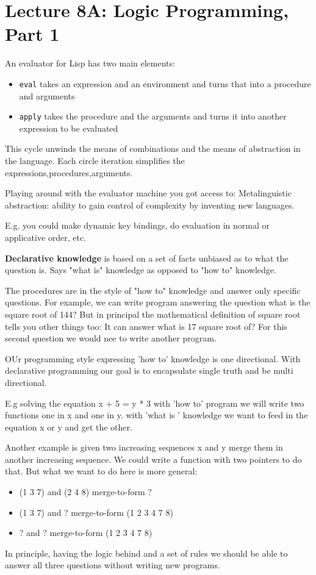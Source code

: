\documentclass[a4paper,twoside]{article}
\numberwithin{equation}{section}
\begin{document}
\section{Lecture 8A: Logic Programming, Part 1}
An evaluator for Lisp has two main elements:
\begin{itemize}
    \item \texttt{eval} takes an expression and an environment and turns that into a procedure and arguments
    \item \texttt{apply} takes the procedure and the arguments and turns it into another expression to be evaluated
\end{itemize}
This cycle unwinds the means of combinations and the means of abstraction in the language.
Each circle iteration simplifies the expressions,procedures,arguments.


Playing around with  the evaluator machine you got access to:
Metalinguistic abstraction: ability to gain control of complexity by inventing new languages.

E.g. you could make dynamic key bindings, do evaluation in normal or applicative order, etc.

\textbf{Declarative knowledge} is based on a set of facts unbiased as to what the question is.
Says "what is" knowledge as opposed to "how to" knowledge.

The procedures are in the style of "how to" knowledge and answer only specific questions.
For example, we can write program answering the question what is the square root of 144?
But in principal the mathematical definition of square root tells you other things too: It can answer
what is 17 square root of? For this second question we would nee to write another program.

OUr programming style expressing 'how to' knowledge is one directional. With declarative programming
our goal is to encapsulate single truth and be multi directional.

E.g solving the equation x + 5 = y * 3
with 'how to' program we will write two functions one in x and one in y.
with 'what is ' knowledge we want to feed in the equation x or y and get the other.

Another example is given two increasing sequences x and y merge them in another increasing sequence.
We could write a function with two pointers to do that. But what we want to do here is more general:
\begin{itemize}
    \item (1 3 7) and (2 4 8) merge-to-form ?
    \item (1 3 7) and ? merge-to-form (1 2 3 4 7 8)
    \item ? and ? merge-to-form (1 2 3 4 7 8)
\end{itemize}
In principle, having the logic behind and a set of rules we should be able to answer all three questions
without writing new programs.
\end{document}
